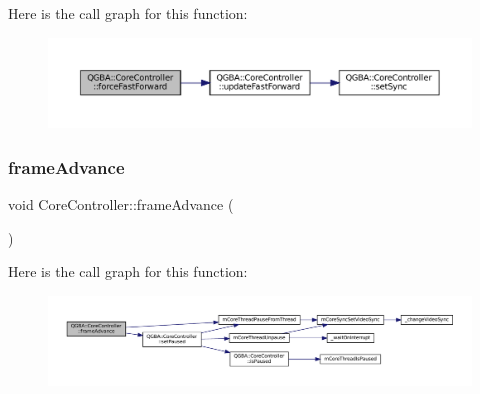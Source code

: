 Here is the call graph for this function\+:
\nopagebreak
\begin{figure}[H]
\begin{center}
\leavevmode
\includegraphics[width=350pt]{class_q_g_b_a_1_1_core_controller_a0dc263f0a6801dc195c4e3ce7500336b_cgraph}
\end{center}
\end{figure}
\mbox{\label{class_q_g_b_a_1_1_core_controller_a7d32f57677b439e8e333eeb222f759db}} 
\subsubsection{\texorpdfstring{frame\+Advance}{frameAdvance}}
{\footnotesize\ttfamily void Core\+Controller\+::frame\+Advance (\begin{DoxyParamCaption}{ }\end{DoxyParamCaption})\hspace{0.3cm}{\ttfamily [slot]}}

Here is the call graph for this function\+:
\nopagebreak
\begin{figure}[H]
\begin{center}
\leavevmode
\includegraphics[width=350pt]{class_q_g_b_a_1_1_core_controller_a7d32f57677b439e8e333eeb222f759db_cgraph}
\end{center}
\end{figure}
\mbox{\label{class_q_g_b_a_1_1_core_controller_a90f0018c959e53a889e14716971b9812}} 
